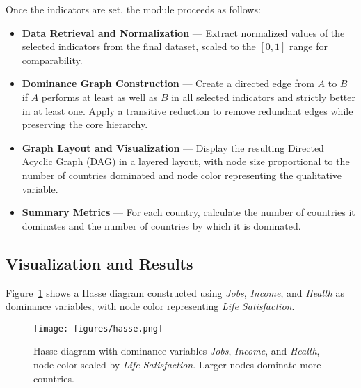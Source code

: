 \documentclass[11pt]{article}
\begin{document}
\medskip
\noindent
Once the indicators are set, the module proceeds as follows:
\begin{itemize}
    \item \textbf{Data Retrieval and Normalization} — Extract normalized values of the selected indicators from the final dataset, scaled to the $[0,1]$ range for comparability.
    \item \textbf{Dominance Graph Construction} — Create a directed edge from $A$ to $B$ if $A$ performs at least as well as $B$ in all selected indicators and strictly better in at least one. Apply a transitive reduction to remove redundant edges while preserving the core hierarchy.
    \item \textbf{Graph Layout and Visualization} — Display the resulting Directed Acyclic Graph (DAG) in a layered layout, with node size proportional to the number of countries dominated and node color representing the qualitative variable.
    \item \textbf{Summary Metrics} — For each country, calculate the number of countries it dominates and the number of countries by which it is dominated.
\end{itemize}

\subsection{Visualization and Results}

\noindent
Figure~\ref{fig:hasse} shows a Hasse diagram constructed using \emph{Jobs}, \emph{Income}, and \emph{Health} as dominance variables, with node color representing \emph{Life Satisfaction}.

\begin{figure}[H]
\centering
\texttt{[image: figures/hasse.png]}
\caption{Hasse diagram with dominance variables \emph{Jobs}, \emph{Income}, and \emph{Health}, node color scaled by \emph{Life Satisfaction}. Larger nodes dominate more countries.}
\label{fig:hasse}
\end{figure}
\end{document}

